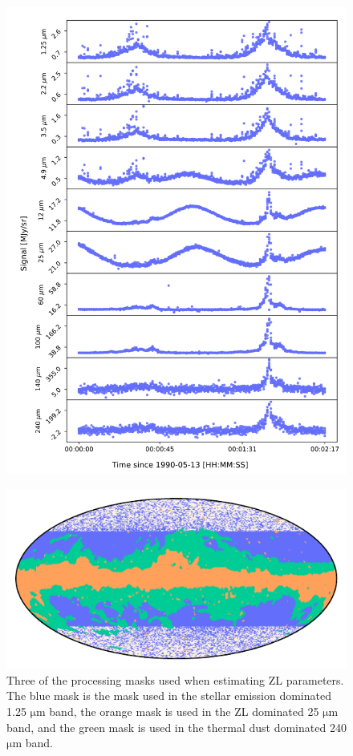 \documentclass[twocolumn]{aa}
\begin{document}
\begin{figure}
    \centering
    \includegraphics[width=\columnwidth]{figs/tod_zodi.pdf}
    \caption{}
    \label{fig:tod_zodi}
\end{figure}


\begin{figure}
    \centering
    \includegraphics[width=\columnwidth]{figs/zodi_proc_masks.pdf}
    \caption{Three of the processing masks used when estimating ZL parameters. The blue mask is the 
    mask used in the stellar emission dominated 1.25 $\mathrm{\mu m}$ band, the orange mask is used 
    in the ZL dominated 25 $\mathrm{\mu m}$ band, and the green mask is used in the thermal dust dominated 
    240 $\mathrm{\mu m}$ band.}
    \label{fig:zodi-procmask}
\end{figure}
\end{document}
